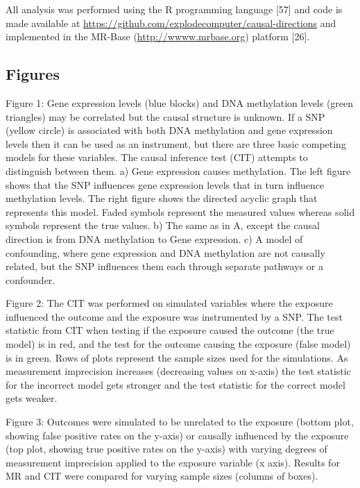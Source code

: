 \documentclass[]{article}
\begin{document}
All analysis was performed using the R programming language {[}57{]} and
code is made available at
\url{https://github.com/explodecomputer/causal-directions} and
implemented in the MR-Base (\url{http://wwww.mrbase.org}) platform
{[}26{]}.

\newpage

\hypertarget{figures}{%
\subsection{Figures}\label{figures}}

Figure 1: Gene expression levels (blue blocks) and DNA methylation
levels (green triangles) may be correlated but the causal structure is
unknown. If a SNP (yellow circle) is associated with both DNA
methylation and gene expression levels then it can be used as an
instrument, but there are three basic competing models for these
variables. The causal inference test (CIT) attempts to distinguish
between them. a) Gene expression causes methylation. The left figure
shows that the SNP influences gene expression levels that in turn
influence methylation levels. The right figure shows the directed
acyclic graph that represents this model. Faded symbols represent the
measured values whereas solid symbols represent the true values. b) The
same as in A, except the causal direction is from DNA methylation to
Gene expression. c) A model of confounding, where gene expression and
DNA methylation are not causally related, but the SNP influences them
each through separate pathways or a confounder.

Figure 2: The CIT was performed on simulated variables where the
exposure influenced the outcome and the exposure was instrumented by a
SNP. The test statistic from CIT when testing if the exposure caused the
outcome (the true model) is in red, and the test for the outcome causing
the exposure (false model) is in green. Rows of plots represent the
sample sizes used for the simulations. As measurement imprecision
increases (decreasing values on x-axis) the test statistic for the
incorrect model gets stronger and the test statistic for the correct
model gets weaker.

Figure 3: Outcomes were simulated to be unrelated to the exposure
(bottom plot, showing false positive rates on the y-axis) or causally
influenced by the exposure (top plot, showing true positive rates on the
y-axis) with varying degrees of measurement imprecision applied to the
exposure variable (x axis). Results for MR and CIT were compared for
varying sample sizes (columns of boxes).
\end{document}
